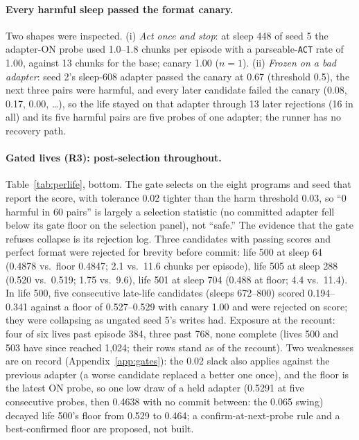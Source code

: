 \documentclass{article}
\begin{document}
\paragraph{Every harmful sleep passed the format canary.} Two shapes were inspected. (i) \emph{Act once and stop}: at sleep 448 of seed 5 the adapter-ON probe used 1.0--1.8 chunks per episode with a parseable-\texttt{ACT} rate of 1.00, against 13 chunks for the base; canary 1.00 ($n = 1$). (ii) \emph{Frozen on a bad adapter}: seed 2's sleep-608 adapter passed the canary at 0.67 (threshold 0.5), the next three pairs were harmful, and every later candidate failed the canary (0.08, 0.17, 0.00, \ldots), so the life stayed on that adapter through 13 later rejections (16 in all) and its five harmful pairs are five probes of one adapter; the runner has no recovery path.

\paragraph{Gated lives (R3): post-selection throughout.} Table~\ref{tab:perlife}, bottom. The gate selects on the eight programs and seed that report the score, with tolerance 0.02 tighter than the harm threshold 0.03, so ``0 harmful in 60 pairs'' is largely a selection statistic (no committed adapter fell below its gate floor on the selection panel), not ``safe.'' The evidence that the gate refuses collapse is its rejection log. Three candidates with passing scores and perfect format were rejected for brevity before commit: life 500 at sleep 64 (0.4878 vs.\ floor 0.4847; 2.1 vs.\ 11.6 chunks per episode), life 505 at sleep 288 (0.520 vs.\ 0.519; 1.75 vs.\ 9.6), life 501 at sleep 704 (0.488 at floor; 4.4 vs.\ 11.4). In life 500, five consecutive late-life candidates (sleeps 672--800) scored 0.194--0.341 against a floor of 0.527--0.529 with canary 1.00 and were rejected on score; they were collapsing as ungated seed 5's writes had. Exposure at the recount: four of six lives past episode 384, three past 768, none complete (lives 500 and 503 have since reached 1{,}024; their rows stand as of the recount). Two weaknesses are on record (Appendix~\ref{app:gates}): the 0.02 slack also applies against the previous adapter (a worse candidate replaced a better one once), and the floor is the latest ON probe, so one low draw of a held adapter (0.5291 at five consecutive probes, then 0.4638 with no commit between: the 0.065 swing) decayed life 500's floor from 0.529 to 0.464; a confirm-at-next-probe rule and a best-confirmed floor are proposed, not built.
\end{document}
